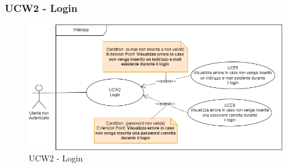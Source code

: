 \subsubsection{UCW2 - Login}
\begin{figure}[!h]
\centering
\includegraphics[scale=0.5]{UC_images/UCW2.png}
\caption{UCW2 - Login}
\end{figure}
